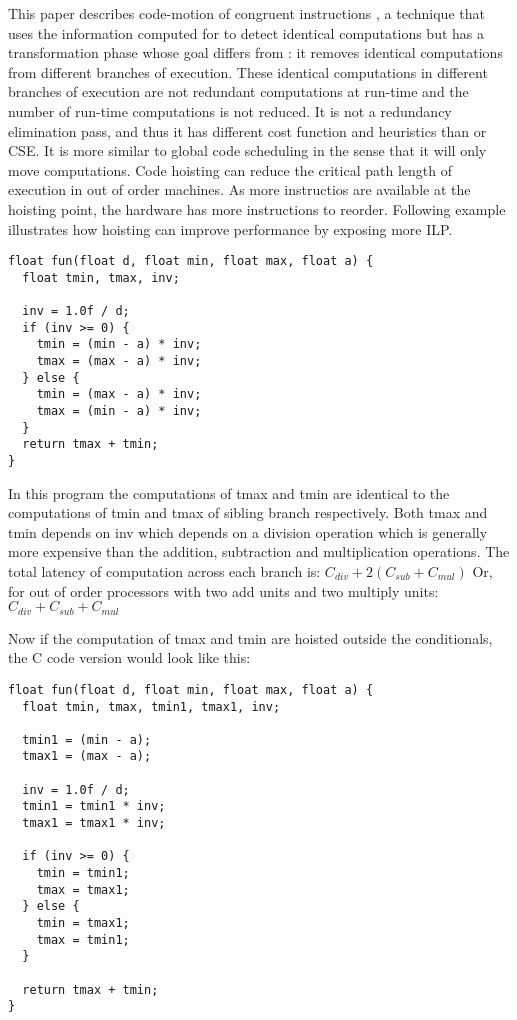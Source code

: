 \documentclass[acmlarge,review]{acmart}\settopmatter{printfolios=true}
\begin{document}
This paper describes code-motion of congruent instructions \cite{briggs1997}, a
technique that uses the information computed for \PRE{} to detect identical
computations but has a transformation phase whose goal differs from \PRE{}: it
removes identical computations from different branches of execution.  These
identical computations in different branches of execution are not redundant
computations at run-time and the number of run-time computations is not
reduced. It is not a redundancy elimination pass, and thus it has different cost
function and heuristics than \PRE{} or CSE. It is more similar to global code
scheduling \cite{dragonbook,click1995global} in the sense that it will only move
computations. Code hoisting can reduce the critical path length of execution in
out of order machines. As more instructios are available at the hoisting point,
the hardware has more instructions to reorder. Following example illustrates how
hoisting can improve performance by exposing more ILP.

\begin{verbatim}
float fun(float d, float min, float max, float a) {
  float tmin, tmax, inv;

  inv = 1.0f / d;
  if (inv >= 0) {
    tmin = (min - a) * inv;
    tmax = (max - a) * inv;
  } else {
    tmin = (max - a) * inv;
    tmax = (min - a) * inv;
  }
  return tmax + tmin;
}
\end{verbatim}

In this program the computations of tmax and tmin are identical to the
computations of tmin and tmax of sibling branch respectively. Both tmax and tmin
depends on inv which depends on a division operation which is generally more
expensive than the addition, subtraction and multiplication operations. The
total latency of computation across each branch is:
$C_{div} + 2(C_{sub} + C_{mul})$
Or, for out of order processors with two add units and two multiply units:
$C_{div} + C_{sub} + C_{mul}$

Now if the computation of tmax and tmin are hoisted outside the
conditionals, the C code version would look like this:
\begin{verbatim}
float fun(float d, float min, float max, float a) {
  float tmin, tmax, tmin1, tmax1, inv;

  tmin1 = (min - a);
  tmax1 = (max - a);

  inv = 1.0f / d;
  tmin1 = tmin1 * inv;
  tmax1 = tmax1 * inv;

  if (inv >= 0) {
    tmin = tmin1;
    tmax = tmax1;
  } else {
    tmin = tmax1;
    tmax = tmin1;
  }

  return tmax + tmin;
}

\end{verbatim}
\end{document}
